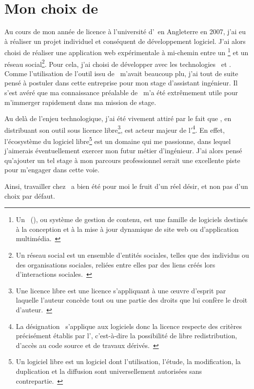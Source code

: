 \section{Mon choix de \asl}

Au cours de mon année de licence à l'université d'\abrookes\ en Angleterre en 2007, j'ai eu à réaliser un projet individuel et conséquent de développement logiciel. J'ai alors choisi de réaliser une application web expérimentale à mi-chemin entre un \acms\footnote{Un \acms\ (\acmsfull), ou système de gestion de contenu, est une famille de logiciels destinés à la conception et à la mise à jour dynamique de site web ou d'application multimédia.~\cite{cms}} et un réseau social\footnote{Un réseau social est un ensemble d'entités sociales, telles que des individus ou des organisations sociales, reliées entre elles par des liens créés lors d'interactions sociales.~\cite{reseausocial}}. Pour cela, j'ai choisi de développer avec les technologies \aphp\ et \asf. Comme l'utilisation de l'outil issu de \asl\ m'avait beaucoup plu, j'ai tout de suite pensé à postuler dans cette entreprise pour mon stage d'assistant ingénieur. Il s'est avéré que ma connaissance préalable de \asf\ m'a été extrêmement utile pour m'immerger rapidement dans ma mission de stage.

Au delà de l'enjeu technologique, j'ai été vivement attiré par le fait que \asl, en distribuant son outil sous licence libre\footnote{Une licence libre est une licence s'appliquant à une œuvre d'esprit par laquelle l'auteur concède tout ou une partie des droits que lui confère le droit d'auteur.~\cite{licencelibre}}, est acteur majeur de l'\aos\footnote{La désignation \aos\ s'applique aux logiciels donc la licence respecte des critères précisément établis par l'\aosinitiative, c'est-à-dire la possibilité de libre redistribution, d'accès au code source et de travaux dérivés.~\cite{os}}. En effet, l'écosystème du logiciel libre\footnote{Un logiciel libre est un logiciel dont l'utilisation, l'étude, la modification, la duplication et la diffusion sont universellement autorisées sans contrepartie.~\cite{logiciellibre}} est un domaine qui me passionne, dans lequel j'aimerais éventuellement exercer mon futur métier d'ingénieur. J'ai alors pensé qu'ajouter un tel stage à mon parcours professionnel serait une excellente piste pour m'engager dans cette voie.

Ainsi, travailler chez \asl\ a bien été pour moi le fruit d'un réel désir, et non pas d'un choix par défaut.
